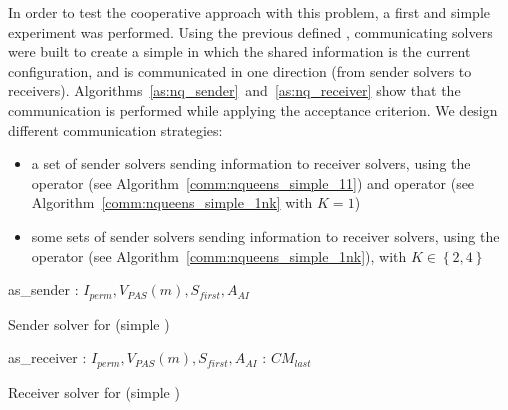 \separation

In order to test the cooperative approach with this problem, a first and simple experiment was performed. Using the previous defined \as{}, communicating solvers were built to create a simple \commstr{} in which the shared information is the current configuration, and is communicated in one direction (from sender solvers to receivers). Algorithms~\ref{as:nq_sender}~and~\ref{as:nq_receiver} show that the communication is performed while applying the acceptance criterion. We design different communication strategies: 
\begin{itemize}
\item a set of sender solvers sending information to receiver solvers, using the \oneTone{} operator (see Algorithm~\ref{comm:nqueens_simple_11}) and operator \oneTn{} (see Algorithm~\ref{comm:nqueens_simple_1nk} with $K=1$)
\item some sets of sender solvers sending information to receiver solvers, using the \oneTn{} operator (see Algorithm~\ref{comm:nqueens_simple_1nk}), with $K\in\left\{2, 4\right\}$
\end{itemize}

\begin{algorithm}[h]
\dontprintsemicolon
\SetNoline
{}
   as\_sender\;
\algoindent {} : $I_{perm}, V_{PAS}(m), S_{first}, A_{AI}$ \;
\caption{Sender solver for \NQP{} (simple \commstr)}\label{as:nq_sender}
\end{algorithm}

\begin{algorithm}[h]
\dontprintsemicolon
\SetNoline
{}
   as\_receiver\;
\algoindent {} : $I_{perm}, V_{PAS}(m), S_{first}, A_{AI}$ \;
\algoindent {}: $CM_{last}$\;
\caption{Receiver solver for \NQP{} (simple \commstr)}\label{as:nq_receiver}
\end{algorithm}

